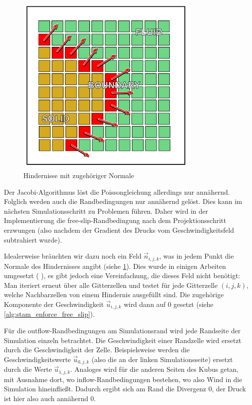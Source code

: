 \begin{figure}[ht]
\centering
\includegraphics[width=9cm]{images/boundary_with_normals}
\caption{Hindernisse mit zugehöriger Normale}
\label{fig:stam_boundary_with_normals}
\end{figure}

Der Jacobi-Algorithmus löst die Poissongleichung allerdings nur annähernd.
Folglich werden auch die Randbedingungen nur annähernd gelöst. Dies kann im
nächsten Simulationsschritt zu Problemen führen. Daher wird in der
Implementierung die free-slip-Rand\-be\-din\-gung nach dem Projektionsschritt
erzwungen (also nachdem der Gradient des Drucks vom Geschwindigkeitsfeld
subtrahiert wurde).

Idealerweise bräuchten wir dazu noch ein Feld $\vec{n}_{i,j,k}$, was in jedem
Punkt die Normale des Hindernisses angibt (siehe
\cref{fig:stam_boundary_with_normals}). Dies wurde in einigen
Arbeiten umgesetzt (\PimiddyzB{} \cite{Bordignon}), es gibt jedoch eine Vereinfachung,
die dieses Feld nicht benötigt: Man iteriert erneut über alle
Gitterzellen und testet für jede Gitterzelle $(i,j,k)$, welche
Nachbarzellen von einem Hindernis ausgefüllt sind. Die zugehörige
Komponente der Geschwindigkeit $\vec{u}_{i,j,k}$ wird dann auf 0
gesetzt (siehe \cref{alg:stam_enforce_free_slip}).

Für die outflow-Randbedingungen am Simulationsrand wird jede Randseite der
Simulation einzeln betrachtet. Die Geschwindigkeit einer Randzelle wird ersetzt
durch die Geschwindigkeit der  Zelle.
Beispielsweise werden die Geschwindigkeitswerte $\vec{u}_{0,j,k}$ (also die an
der linken Simulationsseite) ersetzt durch die Werte $\vec{u}_{1,j,k}$. Analoges
wird für die anderen Seiten des Kubus getan, mit Ausnahme dort, wo
inflow-Randbedingungen bestehen, wo also Wind in die Simulation hineinfließt.
Dadurch ergibt sich am Rand die Divergenz 0, der Druck ist hier also auch
annähernd 0.

